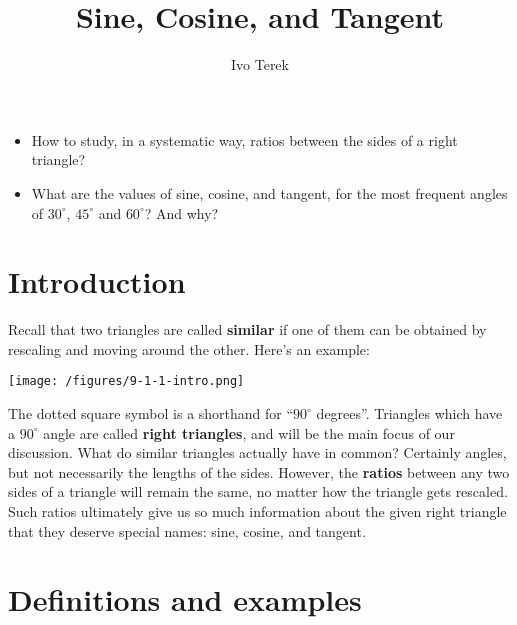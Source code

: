 \documentclass{ximera}
\author{Ivo Terek}
\title{Sine, Cosine, and Tangent}
\begin{document}
\begin{abstract}
  
\end{abstract}
\maketitle



\begin{motivatingQuestions}\begin{itemize}
\item How to study, in a systematic way, ratios between the sides of a right triangle?
\item What are the values of sine, cosine, and tangent, for the most frequent angles of $30^\circ$, $45^\circ$ and $60^\circ$? And why?
\end{itemize}\end{motivatingQuestions}



\section{Introduction}

Recall that two triangles are called {\bf similar} if one of them can be obtained by rescaling and moving around the other. Here's an example:

\begin{center}
  \texttt{[image: /figures/9-1-1-intro.png]}
\end{center}

The dotted square symbol is a shorthand for ``$90^\circ$ degrees''. Triangles which have a $90^\circ$ angle are called {\bf right triangles}, and will be the main focus of our discussion. What do similar triangles actually have in common? Certainly angles, but not necessarily the lengths of the sides. However, the {\bf ratios} between any two sides of a triangle will remain the same, no matter how the triangle gets rescaled. Such ratios ultimately give us so much information about the given right triangle that they deserve special names: sine, cosine, and tangent.


\section{Definitions and examples}
\end{document}
